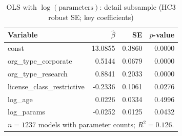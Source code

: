 \begin{table}[t]
\caption{OLS with $\log(\text{parameters})$: detail subsample (HC3 robust SE; key coefficients)}
\label{tab:olsparams}
\centering
\small
\begin{tabular}{lrrr}
\toprule
Variable & $\hat\beta$ & SE & $p$-value \\
\midrule
const & 13.0855 & 0.3860 & 0.0000 \\
org\_type\_corporate & 0.5144 & 0.0679 & 0.0000 \\
org\_type\_research & 0.8841 & 0.2033 & 0.0000 \\
license\_class\_restrictive & -0.2336 & 0.1061 & 0.0276 \\
log\_age & 0.0226 & 0.0334 & 0.4996 \\
log\_params & -0.0252 & 0.0125 & 0.0432 \\
\bottomrule
\multicolumn{4}{l}{$n=1237$ models with parameter counts; $R^2=0.126$.} \\
\end{tabular}
\normalsize
\end{table}
